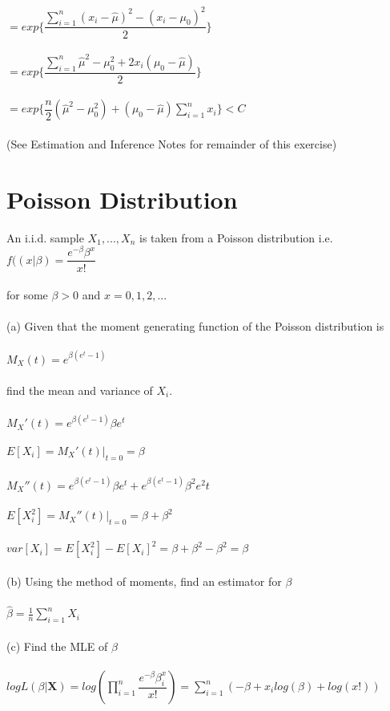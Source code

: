 \documentclass{article}
\begin{document}
$=exp\{\dfrac{\sum_{i=1}^n(x_i-\hat{\mu})^2-(x_i-\mu_0)^2}{2}\}$\\\\
$=exp\{\dfrac{\sum_{i=1}^n\hat{\mu}^2-\mu_0^2+2x_i(\mu_0-\hat{\mu})}{2}\}$\\\\
$=exp\{\dfrac{n}{2}(\hat{\mu}^2-\mu_0^2)+(\mu_0-\hat{\mu})\sum_{i=1}^nx_i\}<C$\\\\
(See Estimation and Inference Notes for remainder of this exercise)
\pagebreak
\section{Poisson Distribution}
An i.i.d. sample $X_1,...,X_n$ is taken from a Poisson distribution i.e.\\
$f((x|\beta)=\dfrac{e^{-\beta}\beta^x}{x!}$\\\\
for some $\beta>0$ and $x=0,1,2,...$\\\\
(a) Given that the moment generating function of the Poisson distribution is\\\\
$M_X(t)=e^{\beta(e^t-1)}$\\\\
find the mean and variance of $X_i$.\\\\
$M_X'(t)=e^{\beta(e^t-1)}\beta e^t$\\\\
$E[X_i]=M_X'(t)|_{t=0}=\beta$\\\\
$M_X''(t)=e^{\beta(e^t-1)}\beta e^t+e^{\beta(e^t-1)}\beta^2e^2t$\\\\
$E[X_i^2]=M_X''(t)|_{t=0}=\beta+\beta^2$\\\\
$var[X_i]=E[X_i^2]-E[X_i]^2=\beta+\beta^2-\beta^2=\beta$\\\\
(b) Using the method of moments, find an estimator for $\beta$\\\\
$\hat{\beta}=\frac{1}{n}\sum_{i=1}^nX_i$\\\\
(c) Find the MLE of $\beta$\\\\
$logL(\beta|\textbf{X})=log(\prod_{i=1}^n\dfrac{e^{-\beta}\beta^x_i}{x!})=\sum_{i=1}^n(-\beta+x_ilog(\beta)+log(x!))$\\\\
\end{document}
